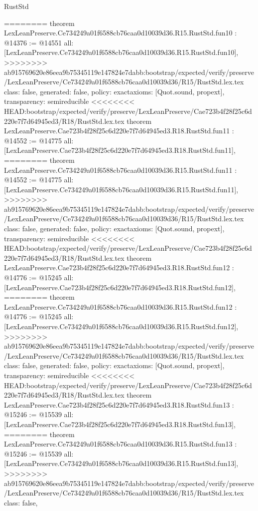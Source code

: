 \begin{lexlean}{RustStd}
\begin{coremodule}
{\begin{coremodule}
{{{{{{{{{{{{{========
theorem LexLeanPreserve.Ce734249a01f6588cb76caa0d10039d36.R15.RustStd.fun10 : @14376 := @14551 {
  all: [LexLeanPreserve.Ce734249a01f6588cb76caa0d10039d36.R15.RustStd.fun10],
>>>>>>>> ab915769620e86eea9b75345119e147824e7dabb:bootstrap/expected/verify/preserve/LexLeanPreserve/Ce734249a01f6588cb76caa0d10039d36/R15/RustStd.lex.tex
  class: false,
  generated: false,
  policy: exact{axioms: [Quot.sound, propext]},
  transparency: semireducible
}
<<<<<<<< HEAD:bootstrap/expected/verify/preserve/LexLeanPreserve/Cae723b4f28f25c6d220e7f7d64945ed3/R18/RustStd.lex.tex
theorem LexLeanPreserve.Cae723b4f28f25c6d220e7f7d64945ed3.R18.RustStd.fun11 : @14552 := @14775 {
  all: [LexLeanPreserve.Cae723b4f28f25c6d220e7f7d64945ed3.R18.RustStd.fun11],
========
theorem LexLeanPreserve.Ce734249a01f6588cb76caa0d10039d36.R15.RustStd.fun11 : @14552 := @14775 {
  all: [LexLeanPreserve.Ce734249a01f6588cb76caa0d10039d36.R15.RustStd.fun11],
>>>>>>>> ab915769620e86eea9b75345119e147824e7dabb:bootstrap/expected/verify/preserve/LexLeanPreserve/Ce734249a01f6588cb76caa0d10039d36/R15/RustStd.lex.tex
  class: false,
  generated: false,
  policy: exact{axioms: [Quot.sound, propext]},
  transparency: semireducible
}
<<<<<<<< HEAD:bootstrap/expected/verify/preserve/LexLeanPreserve/Cae723b4f28f25c6d220e7f7d64945ed3/R18/RustStd.lex.tex
theorem LexLeanPreserve.Cae723b4f28f25c6d220e7f7d64945ed3.R18.RustStd.fun12 : @14776 := @15245 {
  all: [LexLeanPreserve.Cae723b4f28f25c6d220e7f7d64945ed3.R18.RustStd.fun12],
========
theorem LexLeanPreserve.Ce734249a01f6588cb76caa0d10039d36.R15.RustStd.fun12 : @14776 := @15245 {
  all: [LexLeanPreserve.Ce734249a01f6588cb76caa0d10039d36.R15.RustStd.fun12],
>>>>>>>> ab915769620e86eea9b75345119e147824e7dabb:bootstrap/expected/verify/preserve/LexLeanPreserve/Ce734249a01f6588cb76caa0d10039d36/R15/RustStd.lex.tex
  class: false,
  generated: false,
  policy: exact{axioms: [Quot.sound, propext]},
  transparency: semireducible
}
<<<<<<<< HEAD:bootstrap/expected/verify/preserve/LexLeanPreserve/Cae723b4f28f25c6d220e7f7d64945ed3/R18/RustStd.lex.tex
theorem LexLeanPreserve.Cae723b4f28f25c6d220e7f7d64945ed3.R18.RustStd.fun13 : @15246 := @15539 {
  all: [LexLeanPreserve.Cae723b4f28f25c6d220e7f7d64945ed3.R18.RustStd.fun13],
========
theorem LexLeanPreserve.Ce734249a01f6588cb76caa0d10039d36.R15.RustStd.fun13 : @15246 := @15539 {
  all: [LexLeanPreserve.Ce734249a01f6588cb76caa0d10039d36.R15.RustStd.fun13],
>>>>>>>> ab915769620e86eea9b75345119e147824e7dabb:bootstrap/expected/verify/preserve/LexLeanPreserve/Ce734249a01f6588cb76caa0d10039d36/R15/RustStd.lex.tex
  class: false,
}}}}}}}}}}}}}}}}}
\end{coremodule}}
\end{coremodule}
\end{lexlean}
